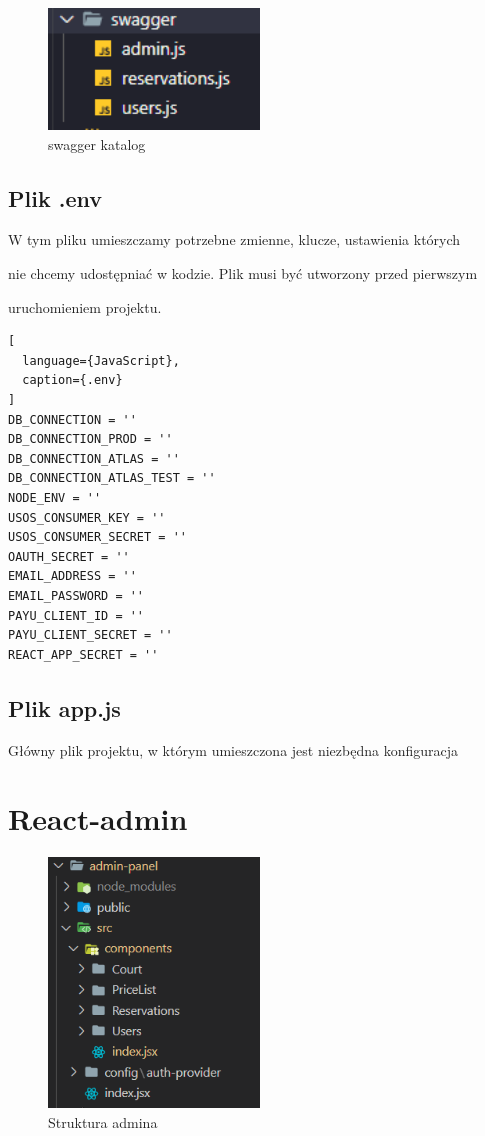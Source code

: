 \documentclass[titlepage]{article}
\begin{document}
\begin{figure}[h]
\centering
\includegraphics[width=0.5\textwidth]{swagger.png}
\caption{swagger katalog}
\label{fig:obrazek swagger}
\end{figure}

\subsection{Plik .env}
W tym pliku umieszczamy potrzebne zmienne, klucze, ustawienia których 

\newline
nie chcemy udostępniać w kodzie. Plik musi być utworzony przed pierwszym

\newline
uruchomieniem projektu.

\begin{lstlisting}[
  language={JavaScript},
  caption={.env}
]
DB_CONNECTION = ''
DB_CONNECTION_PROD = ''
DB_CONNECTION_ATLAS = ''
DB_CONNECTION_ATLAS_TEST = ''
NODE_ENV = ''
USOS_CONSUMER_KEY = ''
USOS_CONSUMER_SECRET = ''
OAUTH_SECRET = ''
EMAIL_ADDRESS = ''
EMAIL_PASSWORD = ''
PAYU_CLIENT_ID = ''
PAYU_CLIENT_SECRET = ''
REACT_APP_SECRET = ''

\end{lstlisting}

\subsection{Plik app.js}
Główny plik projektu, w którym umieszczona jest niezbędna konfiguracja

\newpage
\section{React-admin}

\begin{figure}[h]
\centering
\includegraphics[width=0.5\textwidth]{struktura-admin.png}
\caption{Struktura admina}
\label{fig:obrazek struktura admina}
\end{figure}
\end{document}
